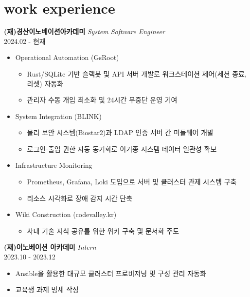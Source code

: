 \documentclass[10pt, a4paper]{article}
\newcommand{\jobtitle}[2]{\textbf{#1} \hfill \textit{#2}}
\newcommand{\dates}[1]{\hfill {\small\color{lightGray} #1}}
\begin{document}
\hfill %
\begin{minipage}[t]{0.62\textwidth} %

    \section*{\huge{work experience}}
    
    \jobtitle{(재)경산이노베이션아카데미}{System Software Engineer} \\
    \dates{2024.02 - 현재}
    \begin{itemize}[leftmargin=1em, label=\textbullet] 
        \item Operational Automation (GsRoot)
        \begin{itemize}
            \item Rust/SQLite 기반 슬랙봇 및 API 서버 개발로 워크스테이션 제어(세션 종료, 리셋) 자동화
            \item 관리자 수동 개입 최소화 및 24시간 무중단 운영 기여
        \end{itemize}
        \item System Integration (BLINK)
        \begin{itemize}
            \item 물리 보안 시스템(Biostar2)과 LDAP 인증 서버 간 미들웨어 개발
            \item 로그인-출입 권한 자동 동기화로 이기종 시스템 데이터 일관성 확보
        \end{itemize}
        \item Infrastructure Monitoring
        \begin{itemize}
            \item Prometheus, Grafana, Loki 도입으로 서버 및 클러스터 관제 시스템 구축
            \item 리소스 시각화로 장애 감지 시간 단축
        \end{itemize}
        \item Wiki Construction (codevalley.kr)
        \begin{itemize}
            \item 사내 기술 지식 공유를 위한 위키 구축 및 문서화 주도
        \end{itemize}
    \end{itemize}

    \vspace{0.8em}

    \jobtitle{(재)이노베이션 아카데미}{Intern} \\
    \dates{2023.10 - 2023.12}
    \begin{itemize}[leftmargin=1em, label=\textbullet]
        \item Ansible을 활용한 대규모 클러스터 프로비저닝 및 구성 관리 자동화
        \item 교육생 과제 명세 작성
    \end{itemize}


\end{minipage}
\end{document}
